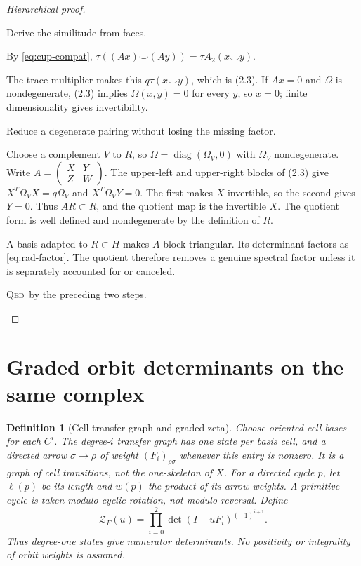\documentclass[11pt,a4paper]{article}
\newtheorem{definition}{Definition}[section]
\theoremstyle{remark}\newtheorem{remark}[definition]{Remark}
\newcommand{\diag}{\operatorname{diag}}\newcommand{\id}{\operatorname{id}}
\newcommand{\QED}{\textsc{Qed}}
\begin{document}
\begin{proof}[Hierarchical proof]
\begin{steps}
\item Derive the similitude from faces.
\begin{steps}
\item By \eqref{eq:cup-compat}, $\tau((Ax)\smile(Ay))=\tau A_2(x\smile y)$.
\item The trace multiplier makes this $q\tau(x\smile y)$, which is (2.3). If $Ax=0$ and $\Omega$ is nondegenerate, (2.3) implies $\Omega(x,y)=0$ for every $y$, so $x=0$; finite dimensionality gives invertibility.
\end{steps}
\item Reduce a degenerate pairing without losing the missing factor.
\begin{steps}
\item Choose a complement $V$ to $R$, so $\Omega=\diag(\Omega_V,0)$ with $\Omega_V$ nondegenerate. Write $A=\left(\begin{smallmatrix}X&Y\\ Z&W\end{smallmatrix}\right)$. The upper-left and upper-right blocks of (2.3) give $X^T\Omega_VX=q\Omega_V$ and $X^T\Omega_VY=0$. The first makes $X$ invertible, so the second gives $Y=0$. Thus $AR\subset R$, and the quotient map is the invertible $X$. The quotient form is well defined and nondegenerate by the definition of $R$.
\item A basis adapted to $R\subset H$ makes $A$ block triangular. Its determinant factors as \eqref{eq:rad-factor}. The quotient therefore removes a genuine spectral factor unless it is separately accounted for or canceled.
\end{steps}
\item \QED\ by the preceding two steps.
\end{steps}
\end{proof}

\section{Graded orbit determinants on the same complex}

\begin{definition}[Cell transfer graph and graded zeta]\label{def:transfer}
Choose oriented cell bases for each $C^i$. The degree-$i$ transfer graph has one state per basis cell, and a directed arrow $\sigma\to\rho$ of weight $(F_i)_{\rho\sigma}$ whenever this entry is nonzero. It is a graph of \emph{cell transitions}, not the one-skeleton of $X$. For a directed cycle $p$, let $\ell(p)$ be its length and $w(p)$ the product of its arrow weights. A primitive cycle is taken modulo cyclic rotation, not modulo reversal. Define
\[
\mathcal Z_F(u)=\prod_{i=0}^2\det(I-uF_i)^{(-1)^{i+1}}.
\tag{3.1}\label{eq:zeta}
\]
Thus degree-one states give numerator determinants. No positivity or integrality of orbit weights is assumed.
\end{definition}
\end{document}
